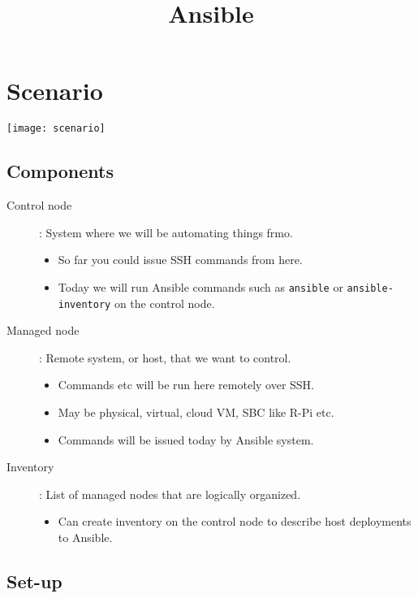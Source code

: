 \documentclass[slides]{pgnotes}
\title{Ansible}
\begin{document}
\maketitle

\tableofcontents

\section{Scenario}

\begin{center}
  \texttt{[image: scenario]}
\end{center}


\subsection{Components}

\begin{description}
\item[Control node]: System where we will be automating things frmo.
  \begin{itemize}
  \item So far you could issue SSH commands from here.
  \item Today we will run Ansible commands such as \texttt{ansible} or \texttt{ansible-inventory} on the control node.
  \end{itemize}
  
\item[Managed node]: Remote system, or host, that we want to control.
  \begin{itemize}
  \item Commands etc will be run here remotely over SSH.
  \item May be physical, virtual, cloud VM, SBC like R-Pi etc.
  \item Commands will be issued today by Ansible system.
  \end{itemize}

\item[Inventory]: List of managed nodes that are logically organized.
  \begin{itemize}
  \item Can create inventory on the control node to describe host deployments to Ansible.
  \end{itemize}

  
\end{description}

\subsection{Set-up}
\end{document}
